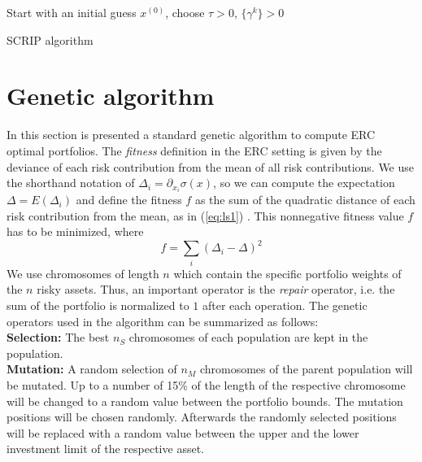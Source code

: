 \begin{algorithm}
Start with an initial guess $x^{(0)}$, choose $\tau > 0$, $\{\gamma^k\}>0$\\
\caption{SCRIP algorithm}
\label{alg:scrip}
\end{algorithm}


\section{Genetic algorithm}
In this section is presented a standard genetic algorithm to compute ERC optimal portfolios. The \textit{fitness} definition in the ERC setting is given by the deviance of each risk contribution from the mean of all risk contributions\footnotemark[3]. We use the shorthand notation of $\Delta_i = \partial_{x_i} \sigma (x)$, so we can compute the expectation $\Delta = E(\Delta_i)$ and define the fitness $f$ as the sum of the quadratic distance of each risk contribution from the mean, as in ({\ref{eq:ls1}) \cite{genetic}. This nonnegative fitness value $f$ has to be minimized, where
\begin{equation}
f= \sum_i (\Delta_i - \Delta)^2
\end{equation}
\hspace{-0.5em}We use chromosomes of length $n$ which contain the specific portfolio weights of the $n$ risky assets. Thus, an important operator is the \textit{repair} operator, i.e. the sum of the portfolio is normalized to $1$ after each operation. The genetic operators used in the algorithm can be summarized as follows:\\[1\baselineskip]
\textbf{Selection: }The best $n_S$ chromosomes of each population are kept in the population.\\[1\baselineskip]
\textbf{Mutation: }A random selection of $n_M$ chromosomes of the parent population will be mutated. Up to a number of 15\% of the length of the respective chromosome will be changed to a random
value between the portfolio bounds. The mutation positions will be chosen randomly. Afterwards the randomly selected positions will be replaced with a random value between the upper and the lower investment limit of the respective asset.\\[1\baselineskip]
}
